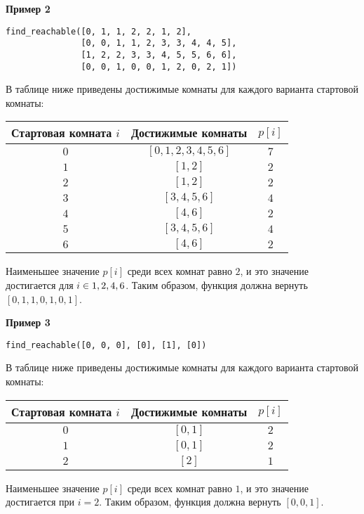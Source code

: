 \textbf{Пример 2}
\begin{verbatim}
find_reachable([0, 1, 1, 2, 2, 1, 2],
               [0, 0, 1, 1, 2, 3, 3, 4, 4, 5],
               [1, 2, 2, 3, 3, 4, 5, 5, 6, 6],
               [0, 0, 1, 0, 0, 1, 2, 0, 2, 1])
\end{verbatim}
В таблице ниже приведены достижимые комнаты для каждого варианта стартовой комнаты:

\begin{center}
\renewcommand{\arraystretch}{1.5}
\begin{tabular}{|c|c|c|}
\hline
Стартовая комната $i$ & Достижимые комнаты & $p[i]$ \\
\hline
$0$ & $[0,1,2,3,4,5,6]$ & $7$\\
\hline
$1$ & $[1,2]$ & $2$\\
\hline
$2$ & $[1,2]$ & $2$\\
\hline
$3$ & $[3,4,5,6]$ & $4$\\
\hline
$4$ & $[4,6]$ & $2$\\
\hline
$5$ & $[3,4,5,6]$ & $4$\\
\hline
$6$ & $[4,6]$ & $2$\\
\hline
\end{tabular}
\end{center}

Наименьшее значение $p[i]$ среди всех комнат равно $2$, и это значение достигается для $i \in \\{1,2,4,6\\}$. Таким образом, функция должна вернуть $[0,1,1,0,1,0,1]$.

\textbf{Пример 3}

\texttt{find\_reachable([0, 0, 0], [0], [1], [0])}

В таблице ниже приведены достижимые комнаты для каждого варианта стартовой комнаты:

\begin{center}
\renewcommand{\arraystretch}{1.5}
\begin{tabular}{|c|c|c|}
\hline
Стартовая комната $i$ & Достижимые комнаты & $p[i]$ \\
\hline
$0$ & $[0,1]$ & $2$\\
\hline
$1$ & $[0,1]$ & $2$\\
\hline
$2$ & $[2]$ & $1$\\
\hline
\end{tabular}
\end{center}

Наименьшее значение $p[i]$ среди всех комнат равно $1$, и это значение достигается при $i=2$. Таким образом, функция должна вернуть $[0,0,1]$.


